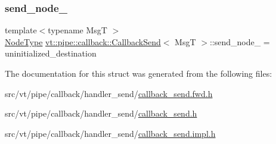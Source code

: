 \mbox{\label{structvt_1_1pipe_1_1callback_1_1_callback_send_abaa3c5d86123d749248b13f7d3728aae}} 
\subsubsection{\texorpdfstring{send\+\_\+node\+\_\+}{send\_node\_}}
{\footnotesize\ttfamily template$<$typename MsgT $>$ \\
\hyperlink{namespacevt_a866da9d0efc19c0a1ce79e9e492f47e2}{Node\+Type} \hyperlink{structvt_1_1pipe_1_1callback_1_1_callback_send}{vt\+::pipe\+::callback\+::\+Callback\+Send}$<$ MsgT $>$\+::send\+\_\+node\+\_\+ = uninitialized\+\_\+destination\hspace{0.3cm}{\ttfamily [private]}}



The documentation for this struct was generated from the following files\+:\begin{DoxyCompactItemize}
\item 
src/vt/pipe/callback/handler\+\_\+send/\hyperlink{callback__send_8fwd_8h}{callback\+\_\+send.\+fwd.\+h}\item 
src/vt/pipe/callback/handler\+\_\+send/\hyperlink{callback__send_8h}{callback\+\_\+send.\+h}\item 
src/vt/pipe/callback/handler\+\_\+send/\hyperlink{callback__send_8impl_8h}{callback\+\_\+send.\+impl.\+h}\end{DoxyCompactItemize}

